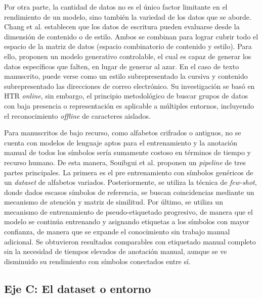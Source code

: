 \documentclass[conference]{IEEEtran}
\begin{document}
Por otra parte, la cantidad de datos no es el único factor limitante en el rendimiento de un modelo, sino también la variedad de los datos que se aborde. Chang et al. \cite{chang_data_2022} establecen que los datos de escritura pueden evaluarse desde la dimensión de contenido o de estilo. Ambos se combinan para lograr cubrir todo el espacio de la matriz de datos (espacio combinatorio de contenido y estilo). Para ello, proponen un modelo generativo controlable, el cual es capaz de generar los datos específicos que falten, en lugar de generar al azar. En el caso de texto manuscrito, puede verse como un estilo subrepresentado la cursiva y contenido subrepresentado las direcciones de correo electrónico. Su investigación se basó en HTR \textit{online}, sin embargo, el principio metodológico de buscar grupos de datos con baja presencia o representación es aplicable a múltiples entornos, incluyendo el reconocimiento \textit{offline} de caracteres aislados.

Para manuscritos de bajo recurso, como alfabetos crifrados o antiguos, no se cuenta con modelos de lenguaje aptos para el entrenamiento y la anotación manual de todos los símbolos sería sumamente costoso en términos de tiempo y recurso humano. De esta manera, Souibgui et al. \cite{souibgui_few_2022} proponen un \textit{pipeline} de tres partes principales. La primera es el pre entrenamiento con símbolos genéricos de un \textit{dataset} de alfabetos variados. Posteriormente, se utiliza la técnica de \textit{few-shot}, donde dados escasos símbolos de referencia, se buscan coincidencias mediante un mecanismo de atención y matriz de similitud. Por último, se utiliza un mecanismo de entrenamiento de pseudo-etiquetado progresivo, de manera que el modelo se continúa entrenando y asignando etiquetas a los símbolos con mayor confianza, de manera que se expande el conocimiento sin trabajo manual adicional. Se obtuvieron resultados comparables con etiquetado manual completo sin la necesidad de tiempos elevados de anotación manual, aunque se ve disminuido su rendimiento con símbolos conectados entre sí. 



\subsection{Eje C: El dataset o entorno}
\label{sec:ejeC}
\end{document}
